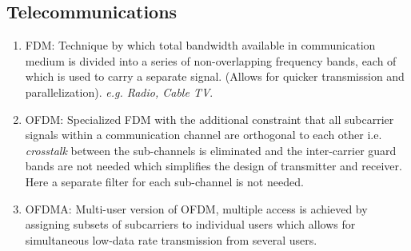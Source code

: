 \documentclass[11pt]{article}
\begin{document}
\subsection{Telecommunications}
\label{sec:org0fabb19}
\begin{enumerate}
\item FDM: Technique by which total bandwidth available in communication medium is divided into a series of non-overlapping frequency bands, each of which is used to carry a separate signal. (Allows for quicker transmission and parallelization). \emph{e.g. Radio, Cable TV}.
\item OFDM: Specialized FDM with the additional constraint that all subcarrier signals within a communication channel are orthogonal to each other i.e. \emph{crosstalk} between the sub-channels is eliminated and the inter-carrier guard bands are not needed which simplifies the design of transmitter and receiver. Here a separate filter for each sub-channel is not needed.
\item OFDMA: Multi-user version of OFDM, multiple access is achieved by assigning subsets of subcarriers to individual users which allows for simultaneous low-data rate transmission from several users.
\end{enumerate}
\end{document}
